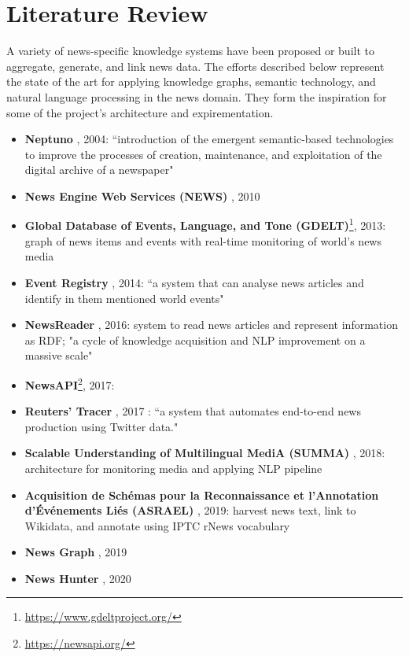 \documentclass[11pt]{article}   	%
\begin{document}
\newpage
\section{Literature Review}
\label{sec:LiteratureReview}

A variety of news-specific knowledge systems have been proposed or built to aggregate, generate, and link news data. The efforts described below represent the state of the art for applying knowledge graphs, semantic technology, and natural language processing in the news domain. They form the inspiration for some of the project's architecture and expirementation.

\begin{itemize}
\item \textbf{Neptuno} \cite{castells2004neptuno}, 2004: ``introduction of the emergent semantic-based technologies to improve the processes of creation, maintenance, and exploitation of the digital archive of a newspaper"
\item \textbf{News Engine Web Services (NEWS)} \cite{fernandez2010news}, 2010
\item \textbf{Global Database of Events, Language, and Tone (GDELT)}\footnote{\url{https://www.gdeltproject.org/}}, 2013: graph of news items and events with real-time monitoring of world's news media
\item \textbf{Event Registry} \cite{leban2014event}, 2014: ``a system that can analyse news articles and identify in them mentioned world events"
\item \textbf{NewsReader} \cite{vossen2016newsreader}, 2016: system to read news articles and represent information as RDF; "a cycle of knowledge acquisition and NLP improvement on a massive scale"
\item \textbf{NewsAPI}\footnote{\url{https://newsapi.org/}}, 2017: 
\item \textbf{Reuters' Tracer} \cite{liu2017reuters}, 2017 : ``a system that automates end-to-end news production using Twitter data."
\item \textbf{Scalable Understanding of Multilingual MediA (SUMMA)} \cite{germann2018integrating}, 2018: architecture for monitoring media and applying NLP pipeline
\item \textbf{Acquisition de Schémas pour la Reconnaissance et l'Annotation d'Événements Liés (ASRAEL)} \cite{rudnik2019searching}, 2019: harvest news text, link to Wikidata, and annotate using IPTC rNews vocabulary
\item \textbf{News Graph} \cite{liu2019news}, 2019
\item \textbf{News Hunter} \cite{berven2020knowledge}, 2020
\end{itemize}
\end{document}
